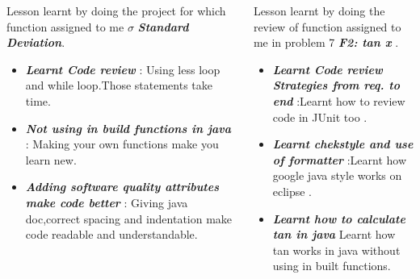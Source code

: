\documentclass[final]{beamer}
\newlength{\onecolwid}
\newlength{\twocolwid}
\begin{document}
\begin{frame}[t]
\begin{columns}[t]
\begin{column}{\twocolwid}
\begin{columns}[t,totalwidth=\twocolwid]
\begin{column}{\onecolwid} %


\begin{block}{Lesson learnt by doing the project for which function assigned to me $\sigma$ \textbf{\textit{Standard Deviation}}.}
\begin{itemize}
\item  \textit{\textbf{Learnt Code review }} : Using less  loop and while loop.Those statements take time.
\item  \textit{\textbf{Not using in build functions in java}} : Making your own functions make you learn new.
\item \textit{\textbf{Adding software quality attributes make code better }} : Giving java doc,correct spacing and indentation make code readable and understandable.
\end{itemize}

\end{block}


\end{column} %

\begin{column}{\onecolwid} %


\begin{block}{ Lesson learnt by doing the review of function assigned to me in problem 7  \textbf{\textit{F2: tan x}} .}
\begin{itemize}
\item  \textit{\textbf{Learnt Code review Strategies from req. to end}} :Learnt how to review code in JUnit too .
\item  \textit{\textbf{Learnt chekstyle and use of formatter }} :Learnt how google java style works on eclipse .
\item \textit{\textbf{Learnt how to calculate tan in java }} Learnt how tan works in java without using in built functions.
\end{itemize}


\end{block}
\end{column}
\end{columns}
\end{column}
\end{columns}
\end{frame}
\end{document}
